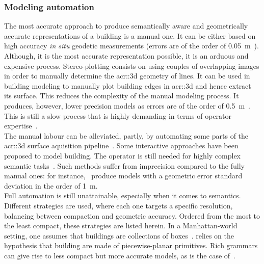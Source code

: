         \subsubsection{Modeling automation}
            The most accurate approach to produce semantically aware and geometrically accurate representations of a building is a manual one.
            It can be either based on high accuracy \textit{in situ} geodetic measurements (errors are of the order of \SI{0.05}{\m}~\parencite{kaartinen2005accuracy}).
            Although, it is the most accurate representation possible, it is an arduous and expensive process.
            Stereo-plotting consists on using couples of overlapping images in order to manually determine the \gls{acr::3d} geometry of lines.
            It can be used in building modeling to manually plot building edges in \gls{acr::3d} and hence extract its surface.
            This reduces the complexity of the manual modeling process.
            It produces, however, lower precision models as errors are of the order of \SI{0.5}{\m}~\parencite{jamet1995building}.
            This is still a slow process that is highly demanding in terms of operator expertise~\parencite{ruther2002application}.\\
            The manual labour can be alleviated, partly, by automating some parts of the \gls{acr::3d} surface aquisition pipeline~\parencite{musialski2013survey}.
            Some interactive approaches have been proposed to model building.
            The operator is still needed for highly complex semantic tasks~\parencite{mayunga2005semi, castellazzi2015laser}.
            Such methods suffer from imprecision compared to the fully manual ones: for instance,~\textcite{mayunga2005semi} produce models with a geometric error standard deviation in the order of \SI{1}{\m}.\\
            Full automation is still unattainable, especially when it comes to semantics.
            Different strategies are used, where each one targets a specific resolution, balancing between compaction and geometric accuracy.
            Ordered from the most to the least compact, these strategies are listed herein.
            In a Manhattan-world setting, one assumes that buildings are collections of boxes~\parencite{vanegas2010building, li2016manhattan}.
            \textcite{lafarge2012creating, nan2017polyfit} relies on the hypothesis that building are made of piecewise-planar primitives.
            Rich grammars can give rise to less compact but more accurate models, as is the case of~\textcite{demir2015procedural,zeng2018neural}.
